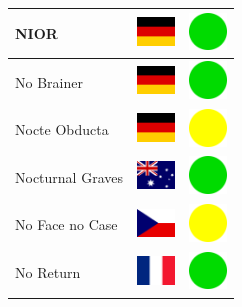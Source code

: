 \documentclass[12pt, a4paper, twoside]{report}
\begin{document}
\begin{center}
\begin{longtable}{|p{5cm}|p{2cm}|p{2cm}|}
 NIOR                                                       & \includegraphics[width=1cm]{../4x3/de} &   \includegraphics[width=1cm]{../likes/y} \\ \hline
 No Brainer                                                 & \includegraphics[width=1cm]{../4x3/de} &   \includegraphics[width=1cm]{../likes/y} \\ \hline
 Nocte Obducta                                              & \includegraphics[width=1cm]{../4x3/de} &   \includegraphics[width=1cm]{../likes/m} \\ \hline
 Nocturnal Graves                                           & \includegraphics[width=1cm]{../4x3/au} &   \includegraphics[width=1cm]{../likes/y} \\ \hline
 No Face no Case                                            & \includegraphics[width=1cm]{../4x3/cz} &   \includegraphics[width=1cm]{../likes/m} \\ \hline
 No Return                                                  & \includegraphics[width=1cm]{../4x3/fr} &   \includegraphics[width=1cm]{../likes/y} \\ \hline

\end{longtable}
\end{center}
\end{document}
